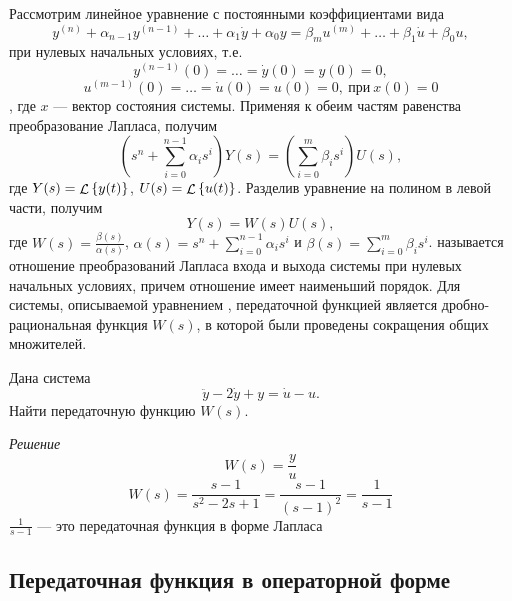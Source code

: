\documentclass[../../TAU.tex]{subfiles}
\begin{document}
    Рассмотрим линейное уравнение с постоянными коэффициентами вида
    \begin{equation}\label{EQ_ODU}
        y^{(n)} + \alpha_{n-1}y^{(n-1)} + \ldots + \alpha_1 \dot y + \alpha_0y = \beta_m u^{(m)} + \ldots + \beta_1 \dot u + \beta_0 u,
    \end{equation}
    при нулевых начальных условиях, т.е. 
    $$
        y^{(n-1)} (0) = \ldots = \dot y(0) = y(0) = 0,
    $$
    $$ 
        u^{(m-1)} (0) = \ldots = \dot u(0) = u(0) = 0,\ \text{при}\ x(0)=0
    $$, 
    где $x$ --- вектор состояния системы.
    Применяя к обеим частям равенства преобразование Лапласа, получим
    \begin{equation}\label{EQ_W}
        \left(s^n + \sum_{i=0}^{n-1}\alpha_is^i\right) Y(s) = \left(\sum_{i=0}^{m}\beta_is^i\right) U(s),
    \end{equation}
    где ${Y(s) = \mathop{\mathcal{L}}\nolimits\left\{y(t)\right\}}$, ${U(s) = \mathop{\mathcal{L}}\nolimits\left\{u(t)\right\}}$. Разделив уравнение  на полином в левой части, получим
    \begin{equation}  
        Y(s) = W(s)U(s),
    \end{equation}
    где 
    ${W(s) = \frac{\beta(s)}{\alpha(s)}}$, 
    ${\alpha(s) = s^n + \sum_{i=0}^{n-1}\alpha_is^i}$ и 
    ${\beta(s) = \sum_{i=0}^{m}\beta_is^i}$.
     называется отношение преобразований Лапласа входа и выхода системы при нулевых начальных условиях, причем отношение имеет наименьший порядок.
    Для системы, описываемой уравнением , передаточной функцией является дробно-рациональная функция $W(s)$, в которой были проведены сокращения общих множителей.

    \examp Дана система
    $$
        \ddot y - 2\dot y + y = \dot u - u.
    $$
    Найти передаточную функцию $W(s)$.
    \pagebreak

    \textit{Решение}
    {
        $$
            W(s)=\frac{y}{u}
        $$
        $$
            W(s)=\frac{s-1}{s^2-2s+1}=\frac{s-1}{(s-1)^2}=\frac{1}{s-1}
        $$
        $\frac{1}{s-1}$ --- это передаточная функция в форме Лапласа
    }

\subsection{Передаточная функция в операторной форме} 
\end{document}

